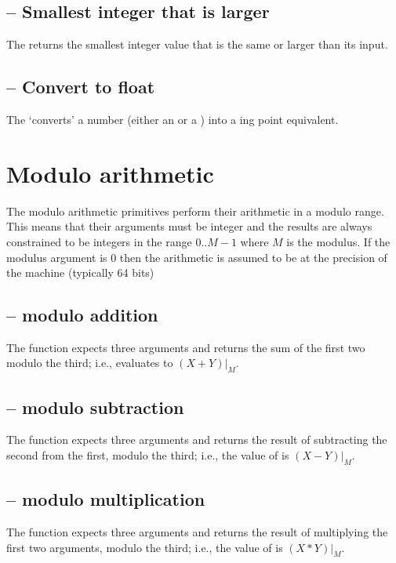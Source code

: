 \subsection{ -- Smallest integer that is larger}
The  returns the smallest integer value that is the same or larger than its input.

\subsection{ -- Convert to float}
\label{arith:n2float}
The  `converts' a number (either an  or a ) into a ing point equivalent.

\section{Modulo arithmetic}
\label{arith:modulo}

The modulo arithmetic primitives perform their arithmetic in a modulo range. This means that their arguments must be integer and the results are always constrained to be integers in the range $0..M-1$ where $M$ is the modulus. If the modulus argument is 0 then the arithmetic is assumed to be at the precision of the machine (typically 64 bits)

\subsection{ -- modulo addition}
The  function expects three  arguments and returns the sum of the first two modulo the third; i.e.,  evaluates to $(X+Y)|_M$.

\subsection{ -- modulo subtraction}
The  function expects three  arguments and returns the result of subtracting the second from the first, modulo the third; i.e., the value of  is $(X-Y)|_M$.

\subsection{ -- modulo multiplication}
The  function expects three  arguments and returns the result of multiplying the first two arguments, modulo the third; i.e., the value of  is $(X*Y)|_M$.

